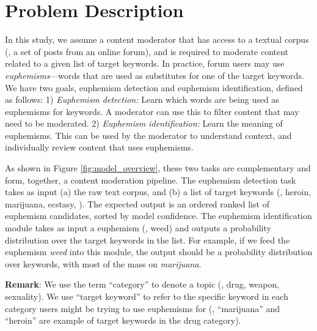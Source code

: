 

\section{Problem Description}
\label{sec:problem}


In this study, we assume a content moderator that has access to a textual corpus (\eg, a set of posts from an online forum), 
and is required to moderate content related to a given list of target keywords. 
In practice, forum users may use \emph{euphemisms}---words that are used as substitutes for  one of the target keywords. 
We have two goals, euphemism detection and euphemism identification, defined as follows: 
1) \emph{Euphemism detection:} Learn which words are being used as euphemisms for keywords. A moderator can use this to filter content that may need to be moderated.
2) \emph{Euphemism identification:} Learn the meaning of euphemisms. This can be used by the moderator to understand context, and individually review content that uses euphemisms. 

As shown in Figure \ref{fig:model_overview}, these two tasks are complementary and form, together, a content moderation pipeline.
The euphemism detection task takes as input (a) the raw text corpus, and (b) a list of target keywords (\eg, heroin, marijuana, ecstasy, \etc). 
The expected output is an ordered ranked list of euphemism candidates, sorted by model confidence. 
The euphemism identification module takes as input a euphemism (\eg, weed) and  outputs a probability distribution over the target keywords in the list. 
For example, if we feed the euphemism \emph{weed} into this module, the output should be a probability distribution over keywords, with most of the mass on \emph{marijuana}.


\noindent \textbf{Remark}: 
We use the term ``category'' to denote a 
topic (\ie, drug, weapon, sexuality). 
We use ``target keyword'' to refer to the specific keyword in each category users might be trying to use euphemisms for (\eg, ``marijuana'' and ``heroin'' are example of target keywords in the drug category). 
